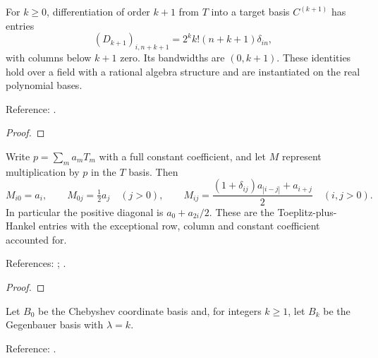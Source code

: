 \begin{theorem}
\label{thm:chebyshev-ultraspherical-derivative-matrix}
\leanok
For $k\ge0$, differentiation of order $k+1$ from $T$ into a target basis
$C^{(k+1)}$ has entries
\[
 (D_{k+1})_{i,n+k+1}=2^k k!(n+k+1)\delta_{in},
\]
with columns below $k+1$ zero. Its bandwidths are $(0,k+1)$.
These identities hold over a field with a rational algebra structure and are
instantiated on the real polynomial bases.

Reference: \cite[Section 3]{olver-townsend}.
\end{theorem}
\begin{proof}
\leanok
\end{proof}

\begin{theorem}
\label{thm:chebyshev-multiplication-entries}
\leanok
Write $p=\sum_m a_mT_m$ with a full constant coefficient, and let $M$ represent
multiplication by $p$ in the $T$ basis. Then
\[
 M_{i0}=a_i,\qquad M_{0j}=\tfrac12a_j\quad(j>0),\qquad
 M_{ij}=\frac{(1+\delta_{ij})a_{|i-j|}+a_{i+j}}2\quad(i,j>0).
\]
In particular the positive diagonal is $a_0+a_{2i}/2$.
These are the Toeplitz-plus-Hankel entries with the exceptional row, column and
constant coefficient accounted for.

References: \cite[Section 2.2, equation (2.7)]{olver-townsend}; \cite[18.18.21]{dlmf}.
\end{theorem}
\begin{proof}
\leanok
\end{proof}

\begin{definition}
\label{def:ultraspherical-ladder}
\leanok
Let $B_0$ be the Chebyshev coordinate basis and, for integers $k\ge1$, let $B_k$
be the Gegenbauer basis with $\lambda=k$.

Reference: \cite[Section 3]{olver-townsend}.
\end{definition}

